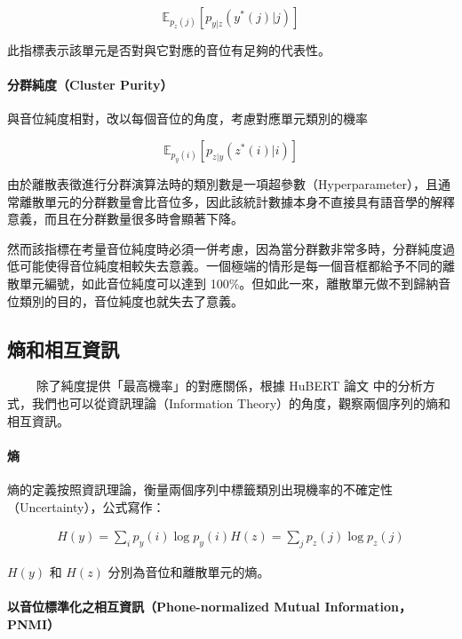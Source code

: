 $$\mathbb{E}_{p_z(j)}\left[p_{y|z}(y^*(j)|j) \right]$$

此指標表示該單元是否對與它對應的音位有足夠的代表性。

\paragraph{分群純度（Cluster Purity）}

與音位純度相對，改以每個音位的角度，考慮對應單元類別的機率

$$\mathbb{E}_{p_y(i)}\left[p_{z|y}(z^*(i)|i) \right]$$

由於離散表徵進行分群演算法時的類別數是一項超參數（Hyperparameter），且通常離散單元的分群數量會比音位多，因此該統計數據本身不直接具有語音學的解釋意義，而且在分群數量很多時會顯著下降。

然而該指標在考量音位純度時必須一併考慮，因為當分群數非常多時，分群純度過低可能使得音位純度相較失去意義。一個極端的情形是每一個音框都給予不同的離散單元編號，如此音位純度可以達到 100\%。但如此一來，離散單元做不到歸納音位類別的目的，音位純度也就失去了意義。





\subsection{熵和相互資訊}
　　
除了純度提供「最高機率」的對應關係，根據 HuBERT 論文 \cite{hsu_hubert_2021-2} 中的分析方式，我們也可以從資訊理論（Information Theory）的角度，觀察兩個序列的熵和相互資訊。

\paragraph{熵}

熵的定義按照資訊理論，衡量兩個序列中標籤類別出現機率的不確定性（Uncertainty），公式寫作：

\begin{align}
    H(y) = \sum_i{p_y(i)\log p_y(i)}
    H(z) = \sum_j{p_z(j)\log p_z(j)}
\end{align}

$H(y)$ 和 $H(z)$ 分別為音位和離散單元的熵。

\paragraph{以音位標準化之相互資訊（Phone-normalized Mutual Information，PNMI）}

